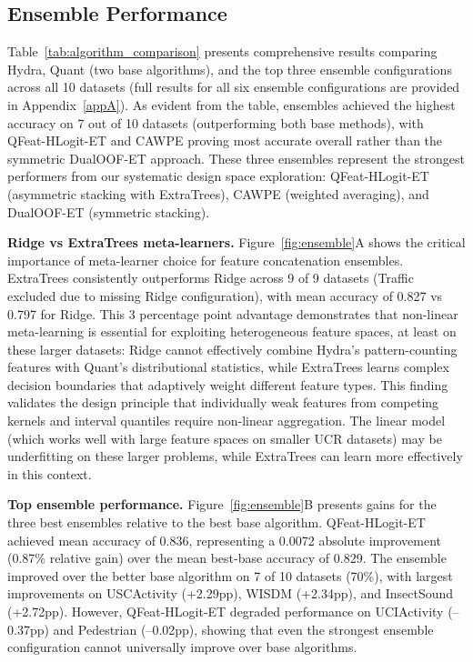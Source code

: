 \documentclass[pdflatex,sn-basic]{sn-jnl}           %
\theoremstyle{thmstyleone}%
\theoremstyle{thmstyletwo}%
\theoremstyle{thmstylethree}%
\begin{document}
\subsection{Ensemble Performance}

Table~\ref{tab:algorithm_comparison} presents comprehensive results comparing Hydra, Quant (two base algorithms), and the top three ensemble configurations across all 10 datasets (full results for all six ensemble configurations are provided in Appendix~\ref{appA}). As evident from the table, ensembles achieved the highest accuracy on 7 out of 10 datasets (outperforming both base methods), with QFeat-HLogit-ET and CAWPE proving most accurate overall rather than the symmetric DualOOF-ET approach. These three ensembles represent the strongest performers from our systematic design space exploration: QFeat-HLogit-ET (asymmetric stacking with ExtraTrees), CAWPE (weighted averaging), and DualOOF-ET (symmetric stacking).



\textbf{Ridge vs ExtraTrees meta-learners.} Figure~\ref{fig:ensemble}A shows the critical importance of meta-learner choice for feature concatenation ensembles. ExtraTrees consistently outperforms Ridge across 9 of 9 datasets (Traffic excluded due to missing Ridge configuration), with mean accuracy of 0.827 vs 0.797 for Ridge. This 3 percentage point advantage demonstrates that non-linear meta-learning is essential for exploiting heterogeneous feature spaces, at least on these larger datasets: Ridge cannot effectively combine Hydra's pattern-counting features with Quant's distributional statistics, while ExtraTrees learns complex decision boundaries that adaptively weight different feature types. This finding validates the design principle that individually weak features from competing kernels and interval quantiles require non-linear aggregation. The linear model (which works well with large feature spaces on smaller UCR datasets) may be underfitting on these larger problems, while ExtraTrees can learn more effectively in this context.

\textbf{Top ensemble performance.} Figure~\ref{fig:ensemble}B presents gains for the three best ensembles relative to the best base algorithm. QFeat-HLogit-ET achieved mean accuracy of 0.836, representing a 0.0072 absolute improvement (0.87\% relative gain) over the mean best-base accuracy of 0.829. The ensemble improved over the better base algorithm on 7 of 10 datasets (70\%), with largest improvements on USCActivity (+2.29pp), WISDM (+2.34pp), and InsectSound (+2.72pp). However, QFeat-HLogit-ET degraded performance on UCIActivity (--0.37pp) and Pedestrian (--0.02pp), showing that even the strongest ensemble configuration cannot universally improve over base algorithms.
\end{document}
